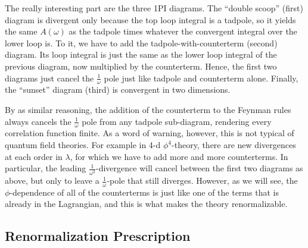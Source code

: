 \documentclass[12pt]{article}
\begin{document}
The really interesting part are the three 1PI diagrams. The ``double
scoop'' (first) diagram is divergent only because the top loop
integral is a tadpole, so it yields the same $A(\omega)$ as the
tadpole times whatever the convergent integral over the lower loop
is. To it, we have to add the tadpole-with-counterterm (second)
diagram. Its loop integral is just the same as the lower loop integral
of the previous diagram, now multiplied by the counterterm. Hence, the
first two diagrams just cancel the $\frac{1}{\omega}$ pole just like
tadpole and counterterm alone. Finally, the ``sunset'' diagram (third)
is convergent in two dimensions.

By as similar reasoning, the addition of the counterterm to the
Feynman rules always cancels the $\frac{1}{\omega}$ pole from any
tadpole sub-diagram, rendering every correlation function finite. As a
word of warning, however, this is not typical of quantum field
theories. For example in 4-d $\phi^4$-theory, there are new
divergences at each order in $\lambda$, for which we have to add more
and more counterterms. In particular, the leading
$\frac{1}{\omega^2}$-divergence will cancel between the first two
diagrams as above, but only to leave a $\frac{1}{\omega}$-pole that
still diverges. However, as we will see, the $\phi$-dependence of all
of the counterterms is just like one of the terms that is already in
the Lagrangian, and this is what makes the theory renormalizable.


\subsection{Renormalization Prescription}
\end{document}

